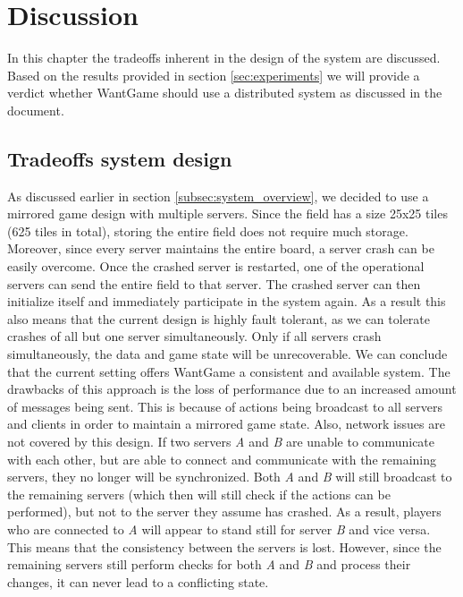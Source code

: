 \section{Discussion}


	In this chapter the tradeoffs inherent in the design of the system are discussed. Based on the results provided in section \ref{sec:experiments} we will provide a verdict whether WantGame should use a distributed system as discussed in the document.
	
	
	\subsection{Tradeoffs system design}
	\label{subsec:tradeoffs_system_design}
		As discussed earlier in section \ref{subsec:system_overview}, we decided to use a mirrored game design with multiple servers. 
		Since the field has a size 25x25 tiles (625 tiles in total), storing the entire field does not require much storage. 
		Moreover, since every server maintains the entire board, a server crash can be easily overcome.
		Once the crashed server is restarted, one of the operational servers can send the entire field to that server. 
		The crashed server can then initialize itself and immediately participate in the system again. 
		As a result this also means that the current design is highly fault tolerant, as we can tolerate crashes of all but one server simultaneously. 
		Only if all servers crash simultaneously, the data and game state will be unrecoverable.
		We can conclude that the current setting offers WantGame a consistent and available system. 
		The drawbacks of this approach is the loss of performance due to an increased amount of messages being sent. 
		This is because of actions being broadcast to all servers and clients in order to maintain a mirrored game state. 
		Also, network issues are not covered by this design. 
		If two servers \emph{A} and \emph{B} are unable to communicate with each other, but are able to connect and communicate with the remaining servers, they no longer will be synchronized. 
		Both \emph{A} and \emph{B} will still broadcast to the remaining servers (which then will still check if the actions can be performed), but not to the server they assume has crashed. 
		As a result, players who are connected to \emph{A} will appear to stand still for server \emph{B} and vice versa. 
		This means that the consistency between the servers is lost. 
		However, since the remaining servers still perform checks for both \emph{A} and \emph{B} and process their changes, it can never lead to a conflicting state.
	
